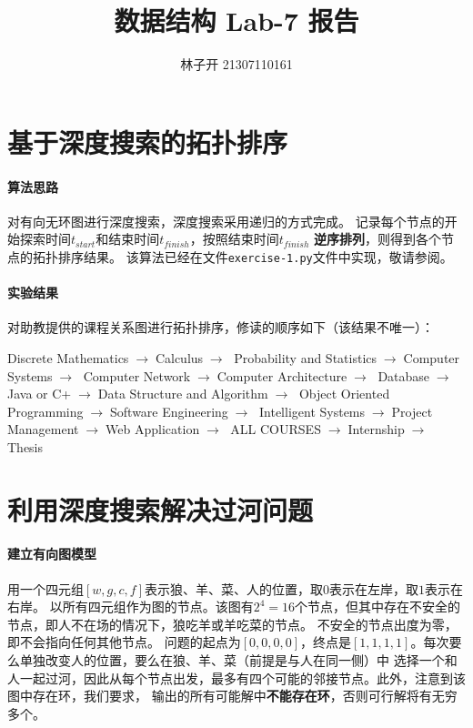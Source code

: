 \documentclass{article}
\title{数据结构 Lab-7 报告}
\author{林子开 21307110161}
\begin{document}
	\maketitle
	\tableofcontents

\section{基于深度搜索的拓扑排序}

\paragraph{算法思路}
对有向无环图进行深度搜索，深度搜索采用递归的方式完成。
记录每个节点的开始探索时间$t_{start}$和结束时间$t_{finish}$，按照结束时间$t_{finish}$
\textbf{逆序排列}，则得到各个节点的拓扑排序结果。
该算法已经在文件\texttt{exercise-1.py}文件中实现，敬请参阅。

\paragraph{实验结果}
对助教提供的课程关系图进行拓扑排序，修读的顺序如下（该结果不唯一）：

Discrete Mathematics$\;\rightarrow\;$Calculus$\;\rightarrow\;$
Probability and Statistics$\;\rightarrow\;$Computer Systems$\;\rightarrow\;$
Computer Network$\;\rightarrow\;$Computer Architecture$\;\rightarrow\;$
Database$\;\rightarrow\;$Java or C+$\;\rightarrow\;$Data Structure and Algorithm$\;\rightarrow\;$
Object Oriented Programming$\;\rightarrow\;$Software Engineering$\;\rightarrow\;$
Intelligent Systems$\;\rightarrow\;$Project Management$\;\rightarrow\;$Web Application$\;\rightarrow\;$
ALL COURSES$\;\rightarrow\;$Internship$\;\rightarrow\;$Thesis

\section{利用深度搜索解决过河问题}
\paragraph{建立有向图模型}
用一个四元组$[w,g,c,f]$表示狼、羊、菜、人的位置，取$0$表示在左岸，取$1$表示在右岸。
以所有四元组作为图的节点。该图有$2^4=16$个节点，但其中存在不安全的节点，即人不在场的情况下，狼吃羊或羊吃菜的节点。
不安全的节点出度为零，即不会指向任何其他节点。
问题的起点为$[0,0,0,0]$，终点是$[1,1,1,1]$。每次要么单独改变人的位置，要么在狼、羊、菜（前提是与人在同一侧）中
选择一个和人一起过河，因此从每个节点出发，最多有四个可能的邻接节点。此外，注意到该图中存在环，我们要求，
输出的所有可能解中\textbf{不能存在环}，否则可行解将有无穷多个。
\end{document}
